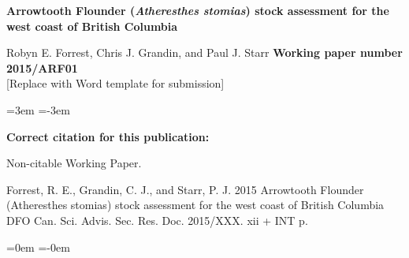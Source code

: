 
\thispagestyle{fancyplain}

\begin{flushleft}
\LARGE \textbf{Arrowtooth Flounder ({\bf \emph{Atheresthes stomias}}) stock assessment for the west coast of British Columbia}

\end{flushleft}
\vfill
{\Large Robyn E. Forrest, Chris J. Grandin, and Paul J. Starr}
\vfill
\vfill
\vfill
{\LARGE \textbf{Working paper number 2015/ARF01}}\\
\vspace{2cm}
[Replace with Word template for submission]
\vfill
\clearpage

\renewcommand{\contentsname}{\bf \large \vspace{-25mm} TABLE OF CONTENTS}

\begin{center}
\tableofcontents
\end{center}
\newpage

\leftskip=3em	%
\parindent=-3em

{\bf Correct citation for this publication:}

Non-citable Working Paper.	%

Forrest, R. E., Grandin, C. J., and Starr, P. J. 2015
Arrowtooth Flounder (Atheresthes stomias) stock assessment for the west coast of British Columbia
DFO Can. Sci. Advis. Sec. Res. Doc. 2015/XXX. xii + INT p.

\leftskip=0em	%
\parindent=-0em

